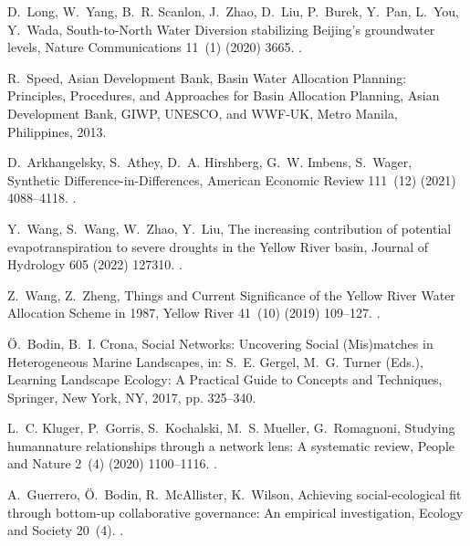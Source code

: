 \documentclass[preprint, 12pt]{elsarticle}
\begin{document}
\begin{thebibliography}{10}
D.~Long, W.~Yang, B.~R. Scanlon, J.~Zhao, D.~Liu, P.~Burek, Y.~Pan, L.~You,
  Y.~Wada, South-to-{{North Water Diversion}} stabilizing {{Beijing}}'s
  groundwater levels, Nature Communications 11~(1) (2020) 3665.
\newblock \href {http://dx.doi.org/10.1038/s41467-020-17428-6}
  {}.

R.~Speed, {Asian Development Bank}, Basin Water Allocation Planning:
  Principles, Procedures, and Approaches for Basin Allocation Planning, {Asian
  Development Bank, GIWP, UNESCO, and WWF-UK}, {Metro Manila, Philippines},
  2013.

D.~Arkhangelsky, S.~Athey, D.~A. Hirshberg, G.~W. Imbens, S.~Wager, Synthetic
  {{Difference-in-Differences}}, American Economic Review 111~(12) (2021)
  4088--4118.
\newblock \href {http://dx.doi.org/10.1257/aer.20190159}
  {}.

Y.~Wang, S.~Wang, W.~Zhao, Y.~Liu, The increasing contribution of potential
  evapotranspiration to severe droughts in the {{Yellow River}} basin, Journal
  of Hydrology 605 (2022) 127310.
\newblock \href {http://dx.doi.org/10.1016/j.jhydrol.2021.127310}
  {}.

Z.~Wang, Z.~Zheng, {Things and Current Significance of the Yellow River Water
  Allocation Scheme in 1987}, Yellow River 41~(10) (2019) 109--127.
\newblock \href {http://dx.doi.org/10.3969/j.issn.1000-1379.2019.10.019}
  {}.

{\"O}.~Bodin, B.~I. Crona, Social {{Networks}}: {{Uncovering
  Social}} ({{Mis}})matches in {{Heterogeneous Marine
  Landscapes}}, in: S.~E. Gergel, M.~G. Turner (Eds.), Learning {{Landscape
  Ecology}}: {{A Practical Guide}} to {{Concepts}} and {{Techniques}},
  {Springer}, {New York, NY}, 2017, pp. 325--340.

L.~C. Kluger, P.~Gorris, S.~Kochalski, M.~S. Mueller, G.~Romagnoni, Studying
  human\textendash nature relationships through a network lens: {{A}}
  systematic review, People and Nature 2~(4) (2020) 1100--1116.
\newblock \href {http://dx.doi.org/10.1002/pan3.10136}
  {}.

A.~Guerrero, {\"O}.~Bodin, R.~McAllister, K.~Wilson, Achieving
  social-ecological fit through bottom-up collaborative governance: An
  empirical investigation, Ecology and Society 20~(4).
\newblock \href {http://dx.doi.org/10.5751/ES-08035-200441}
  {}.


\end{thebibliography}
\end{document}
